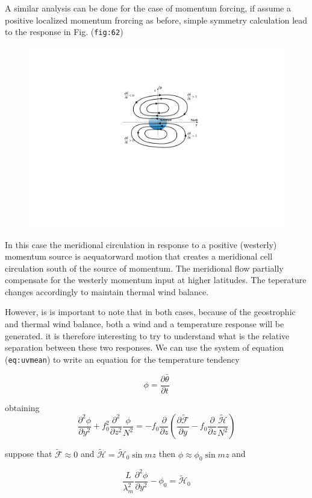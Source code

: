 A similar analysis can be done for the case of momentum forcing, if
assume a positive localized momentum frorcing as before, simple symmetry
calculation lead to the response in Fig. (\texttt{fig:62})

\begin{figure}
\centering
\includegraphics[width = .7 \textwidth]{figs/GD/FForcing.png}
\caption{}
\label{fig:}
\end{figure}

In this case the meridional circulation in response to a positive
(westerly) momentum source is aequatorward motion that creates a
meridional cell circulation south of the source of momentum. The
meridional flow partially compensate for the westerly momentum input at
higher latitudes. The teperature changes accordingly to maintain thermal
wind balance.

However, is is important to note that in both cases, because of the
geostrophic and thermal wind balance, both a wind and a temperature
response will be generated. it is therefore interesting to try to
understand what is the relative separation between these two responses.
We can use the system of equation (\texttt{eq:uvmean}) to write an
equation for the temperature tendency

\[\phi = \frac{\partial \bar{\theta}}{\partial t}\]

obtaining
\[
\frac{\partial^{2} \phi}{\partial y^{2}} + f_0^2\frac{\partial^{2} }{\partial z^{2}} \frac{\phi}{N^2} = 
-f_0 \frac{\partial }{\partial z} \left( \frac{\partial \widetilde{\mathcal{F}}}{\partial y} -f_0 \frac{\partial }{\partial z} \frac{\widetilde{\mathcal{H}}}{N^2} \right)
\]

suppose that \( \widetilde{\mathcal{F}} \approx 0\) and
\(\widetilde{\mathcal{H}} = \widetilde{\mathcal{H}}_0 \sin{m z}\) then
\(\phi \approx \phi_0 \sin{m z}\) and

\[
\frac{L}{\lambda_m^2} \frac{\partial^{2} \phi}{\partial y^{2}} - \phi_0 =  \widetilde{\mathcal{H}}_0
\]

